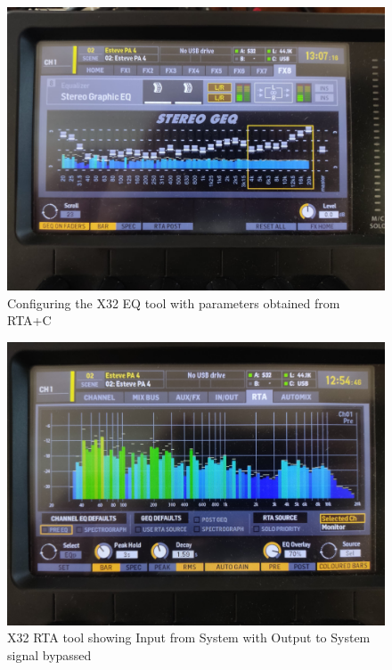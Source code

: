 \begin{figure}[H]
	\centering
	\includegraphics[width=0.8
	\linewidth]{Figures/Coro_X32_EQ.jpeg}
	\caption{Configuring the X32 EQ tool with parameters obtained from RTA+C}
	\label{fig:Coro_X32_EQ}
\end{figure}

\begin{figure}[H]
	\centering
	\includegraphics[width=0.8
	\linewidth]{Figures/Coro_X32_nontreated.jpeg}
	\caption[X32 RTA tool with bypass enabled]{X32 RTA tool showing Input from System with Output to System signal bypassed}
	\label{fig:Coro_X32_nontreated}
\end{figure}


